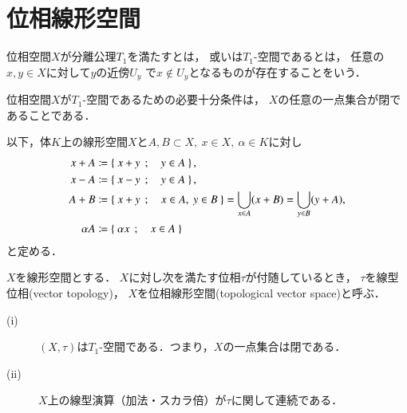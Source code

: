 \section{位相線形空間}
	位相空間$X$が分離公理$T_1$を満たすとは，
	或いは$T_1$-空間であるとは，
	任意の$x,y \in X$に対して$y$の近傍$U_y$
	で$x \notin U_y$となるものが存在することをいう．
	
	\begin{screen}
		\begin{thm}[$T_1$-空間の特徴づけ]
			位相空間$X$が$T_1$-空間であるための必要十分条件は，
			$X$の任意の一点集合が閉であることである．
		\end{thm}
	\end{screen}
	
	
	以下，体$K$上の線形空間$X$と$A,B \subset X,\ x \in X,\ \alpha \in K$に対し
	\begin{align}
		x + A &\coloneqq \left\{\ x + y\ \, ; \quad y \in A\ \right\}, \\
		x - A &\coloneqq \left\{\ x - y\ \, ; \quad y \in A\ \right\}, \\
		A + B &\coloneqq \left\{\ x+y\ \, ; \quad x \in A,\ y \in B\ \right\} = \bigcup_{x \in A} (x + B) 
			= \bigcup_{y \in B} (y + A), \\
		\alpha A &\coloneqq \left\{\ \alpha x\ \, ; \quad x \in A\ \right\} 
	\end{align}
	と定める．
	\begin{screen}
		\begin{dfn}[位相線形空間]
			$X$を線形空間とする．
			$X$に対し次を満たす位相$\tau$が付随しているとき，
			$\tau$を線型位相(vector topology)，
			$X$を位相線形空間(topological vector space)と呼ぶ．
			\begin{description}
				\item[(i)] $(X,\tau)$は$T_1$-空間である．つまり，$X$の一点集合は閉である．
				\item[(ii)] $X$上の線型演算（加法・スカラ倍）が$\tau$に関して連続である．
			\end{description}
		\end{dfn}
	\end{screen}